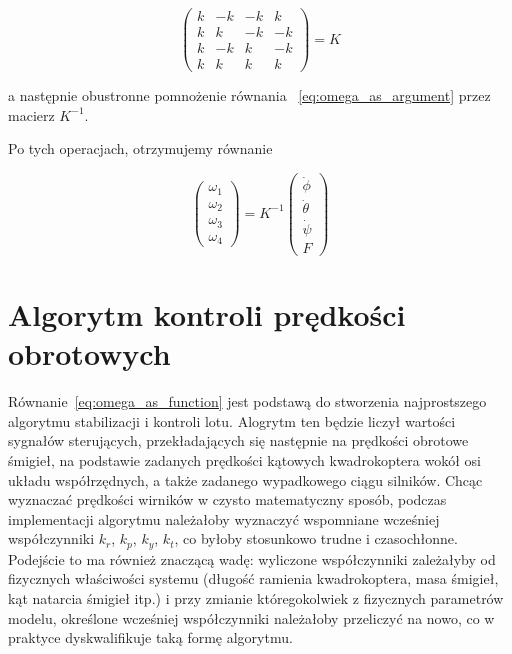 \begin{equation}
	\begin{pmatrix}
		k & -k & -k & k \\
		k & k & -k & -k \\
		k & -k & k & -k \\
		k & k & k & k
	\end{pmatrix} = K
\end{equation}

a następnie obustronne pomnożenie równania ~\ref{eq:omega_as_argument} przez macierz $K^{-1}$. 

Po tych operacjach, otrzymujemy równanie

\begin{equation}
	\label{eq:omega_as_function}
	\begin{pmatrix}
		\omega_1 \\
		\omega_2 \\
		\omega_3 \\
		\omega_4
	\end{pmatrix} = K^{-1} 
	\begin{pmatrix}
		\dot{\phi} \\
		\dot{\theta} \\
		\dot{\psi} \\
		F
	\end{pmatrix}
\end{equation}

\section{Algorytm kontroli prędkości obrotowych}

Równanie~\ref{eq:omega_as_function} jest podstawą do stworzenia najprostszego algorytmu stabilizacji i kontroli lotu. Alogrytm ten będzie liczył wartości sygnałów sterujących, przekładających się następnie na prędkości obrotowe śmigieł, na podstawie zadanych prędkości kątowych kwadrokoptera wokół osi układu współrzędnych, a także zadanego wypadkowego ciągu silników. Chcąc wyznaczać prędkości wirników w czysto matematyczny sposób, podczas implementacji algorytmu należałoby wyznaczyć wspomniane wcześniej współczynniki $k_r$, $k_p$, $k_y$, $k_t$, co byłoby stosunkowo trudne i czasochłonne. Podejście to ma również znaczącą wadę: wyliczone współczynniki zależałyby od fizycznych właściwości systemu (długość ramienia kwadrokoptera, masa śmigieł, kąt natarcia śmigieł itp.) i przy zmianie któregokolwiek z fizycznych parametrów modelu, określone wcześniej współczynniki należałoby przeliczyć na nowo, co w praktyce dyskwalifikuje taką formę algorytmu. 

